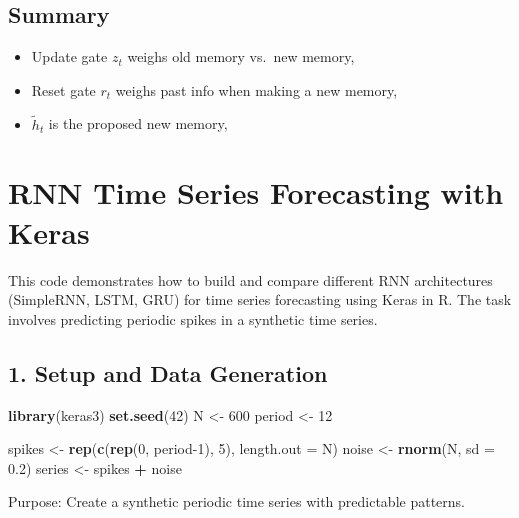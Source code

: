 \documentclass[
]{article}
\newenvironment{Shaded}{\begin{snugshade}}{\end{snugshade}}
\newcommand{\AttributeTok}[1]{\textcolor[rgb]{0.13,0.29,0.53}{#1}}
\newcommand{\DecValTok}[1]{\textcolor[rgb]{0.00,0.00,0.81}{#1}}
\newcommand{\FloatTok}[1]{\textcolor[rgb]{0.00,0.00,0.81}{#1}}
\newcommand{\FunctionTok}[1]{\textcolor[rgb]{0.13,0.29,0.53}{\textbf{#1}}}
\newcommand{\NormalTok}[1]{#1}
\newcommand{\OtherTok}[1]{\textcolor[rgb]{0.56,0.35,0.01}{#1}}
\newcommand{\SpecialCharTok}[1]{\textcolor[rgb]{0.81,0.36,0.00}{\textbf{#1}}}
\providecommand{\tightlist}{%
  \setlength{\itemsep}{0pt}\setlength{\parskip}{0pt}}
\begin{document}
\subsection{Summary}\label{summary-1}

\begin{itemize}
\tightlist
\item
  Update gate \(z_t\) weighs old memory vs.~new memory,
\item
  Reset gate \(r_t\) weighs past info when making a new memory,
\item
  \(\tilde{h}_t\) is the proposed new memory,
\end{itemize}

\section{RNN Time Series Forecasting with
Keras}\label{rnn-time-series-forecasting-with-keras}

This code demonstrates how to build and compare different RNN
architectures (SimpleRNN, LSTM, GRU) for time series forecasting using
Keras in R. The task involves predicting periodic spikes in a synthetic
time series.

\subsection{1. Setup and Data
Generation}\label{setup-and-data-generation}

\begin{Shaded}
\begin{Highlighting}[]
\FunctionTok{library}\NormalTok{(keras3)}
\FunctionTok{set.seed}\NormalTok{(}\DecValTok{42}\NormalTok{)}
\NormalTok{N }\OtherTok{\textless{}{-}} \DecValTok{600}
\NormalTok{period }\OtherTok{\textless{}{-}} \DecValTok{12}

\NormalTok{spikes }\OtherTok{\textless{}{-}} \FunctionTok{rep}\NormalTok{(}\FunctionTok{c}\NormalTok{(}\FunctionTok{rep}\NormalTok{(}\DecValTok{0}\NormalTok{, period}\DecValTok{{-}1}\NormalTok{), }\DecValTok{5}\NormalTok{), }\AttributeTok{length.out =}\NormalTok{ N)}
\NormalTok{noise }\OtherTok{\textless{}{-}} \FunctionTok{rnorm}\NormalTok{(N, }\AttributeTok{sd =} \FloatTok{0.2}\NormalTok{)}
\NormalTok{series }\OtherTok{\textless{}{-}}\NormalTok{ spikes }\SpecialCharTok{+}\NormalTok{ noise}
\end{Highlighting}
\end{Shaded}

Purpose: Create a synthetic periodic time series with predictable
patterns.
\end{document}
